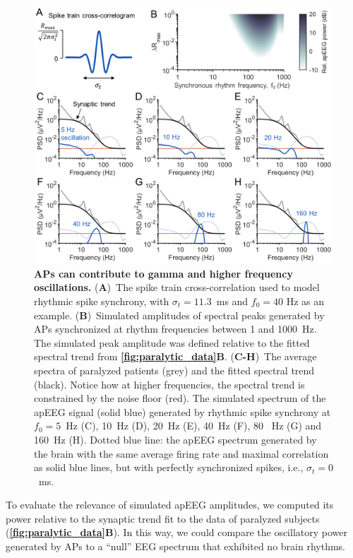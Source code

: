 \begin{figure}[t!]
    \centering
    \includegraphics[width=13.2cm]{Figures/chapter3/figure6.png}
    \caption{\textbf{APs can contribute to gamma and higher frequency oscillations.} (\textbf{A})~The spike train cross-correlation used to model rhythmic spike synchrony, with $\sigma_t=11.3$~\unit{\milli\second} and $f_0=40$ \unit{\hertz} as an example. (\textbf{B})~Simulated amplitudes of spectral peaks generated by APs synchronized at rhythm frequencies between 1 and 1000~\unit{\hertz}. The simulated peak amplitude was defined relative to the fitted spectral trend from \textbf{\autoref{fig:paralytic_data}B}. (\textbf{C-H})~The average spectra of paralyzed patients (grey) and the fitted spectral trend (black). Notice how at higher frequencies, the spectral trend is constrained by the noise floor (red). The simulated spectrum of the apEEG signal (solid blue) generated by rhythmic spike synchrony at $f_0=5$~\unit{\hertz} (C), 10~\unit{\hertz} (D), 20~\unit{\hertz} (E), 40~\unit{\hertz} (F), 80 ~\unit{\hertz} (G) and 160~\unit{\hertz} (H). Dotted blue line: the apEEG spectrum generated by the brain with the same average firing rate and maximal correlation as solid blue lines, but with perfectly synchronized spikes, i.e., $\sigma_t=0$~\unit{\milli\second}.}
    \label{fig:oscillations}
\end{figure}

To evaluate the relevance of simulated apEEG amplitudes, we computed its power relative to the synaptic trend fit to the data of paralyzed subjects (\textbf{\autoref{fig:paralytic_data}B}). In this way, we could compare the oscillatory power generated by APs to a ``null'' EEG spectrum that exhibited no brain rhythms.

